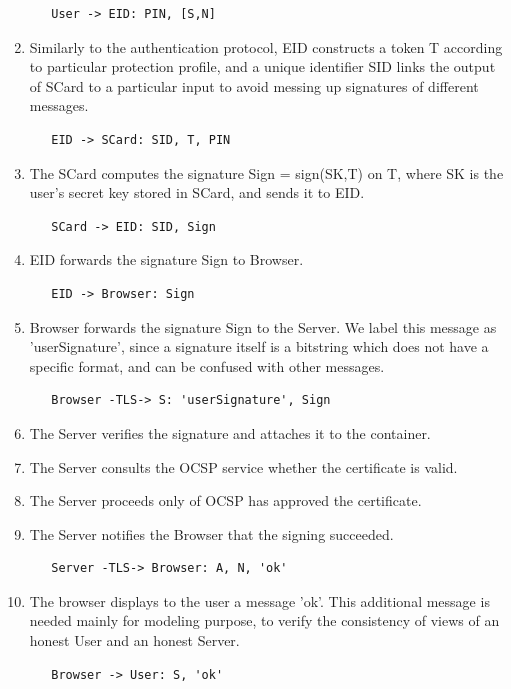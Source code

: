 \begin{enumerate}
\begin{verbatim}
   User -> EID: PIN, [S,N]
\end{verbatim}
\item Similarly to the authentication protocol, EID constructs a token T according to particular protection profile, and a unique identifier SID links the output of SCard to a particular input to avoid messing up signatures of different messages.
\begin{verbatim}
   EID -> SCard: SID, T, PIN
\end{verbatim}
\item The SCard computes the signature Sign = sign(SK,T) on T, where SK is the user's secret key stored in SCard, and sends it to EID.
\begin{verbatim}
   SCard -> EID: SID, Sign
\end{verbatim}
\item EID forwards the signature Sign to Browser.
\begin{verbatim}
   EID -> Browser: Sign
\end{verbatim}
\item Browser forwards the signature Sign to the Server. We label this message as 'userSignature', since a signature itself is a bitstring which does not have a specific format, and can be confused with other messages.
\begin{verbatim}
   Browser -TLS-> S: 'userSignature', Sign
\end{verbatim}
\item The Server verifies the signature and attaches it to the container.

\item The Server consults the OCSP service whether the certificate is valid.

\item The Server proceeds only of OCSP has approved the certificate.

\item The Server notifies the Browser that the signing succeeded.
\begin{verbatim}
   Server -TLS-> Browser: A, N, 'ok'
\end{verbatim}
\item The browser displays to the user a message 'ok'. This additional message is needed mainly for modeling purpose, to verify the consistency of views of an honest User and an honest Server.
\begin{verbatim}
   Browser -> User: S, 'ok'
\end{verbatim}
\end{enumerate}

